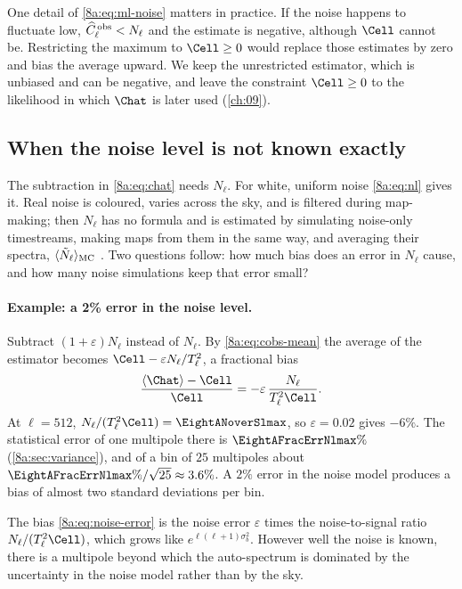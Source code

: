 One detail of \eqref{8a:eq:ml-noise} matters in practice. If the noise happens to fluctuate
low, $\widehat C^{\,\rm obs}_\ell<N_\ell$ and the estimate is negative, although $\Cell$ cannot
be. Restricting the maximum to $\Cell\ge0$ would replace those estimates by zero and bias the
average upward. We keep the unrestricted estimator, which is unbiased and can be negative,
and leave the constraint $\Cell\ge0$ to the likelihood in which $\Chat$ is later used
(\cref{ch:09}).

\subsection{When the noise level is not known exactly}
\label{8a:sec:noise-error}

The subtraction in \eqref{8a:eq:chat} needs $N_\ell$. For white, uniform noise
\eqref{8a:eq:nl} gives it. Real noise is coloured, varies across the sky, and is filtered
during map-making; then $N_\ell$ has no formula and is estimated by simulating noise-only
timestreams, making maps from them in the same way, and averaging their spectra,
$\langle\tilde N_\ell\rangle_{\rm MC}$ . Two questions follow: how much bias
does an error in $N_\ell$ cause, and how many noise simulations keep that error small?

\paragraph{Example: a 2\% error in the noise level.}
Subtract $(1+\varepsilon)N_\ell$ instead of $N_\ell$. By \eqref{8a:eq:cobs-mean} the average of
the estimator becomes $\Cell-\varepsilon N_\ell/T_\ell^2$, a fractional bias
\begin{equation}
  \frac{\langle\Chat\rangle-\Cell}{\Cell}=-\varepsilon\,\frac{N_\ell}{T_\ell^2\Cell} .
  \label{8a:eq:noise-error}
\end{equation}
At $\ell=512$, $N_\ell/(T_\ell^2\Cell)=\EightANoverSlmax$, so $\varepsilon=0.02$ gives $-6\%$. The
statistical error of one multipole there is $\EightAFracErrNlmax\%$ (\cref{8a:sec:variance}), and of
a bin of $25$ multipoles about $\EightAFracErrNlmax\%/\sqrt{25}\approx3.6\%$. A $2\%$ error in the
noise model produces a bias of almost two standard deviations per bin.

\begin{pitfall}
The bias \eqref{8a:eq:noise-error} is the noise error $\varepsilon$ times the noise-to-signal
ratio $N_\ell/(T_\ell^2\Cell)$, which grows like $e^{\ell(\ell+1)\sigma_b^2}$. However well the
noise is known, there is a multipole beyond which the auto-spectrum is dominated by the
uncertainty in the noise model rather than by the sky.
\end{pitfall}


